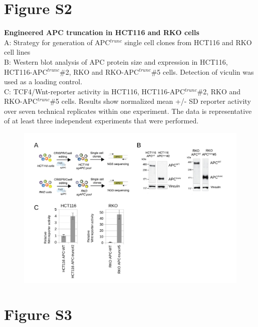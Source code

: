 \documentclass[11pt,a4paper,titlepage]{article}
\begin{document}
\pagebreak

\section*{Figure S2}

\textbf{Engineered APC truncation in HCT116 and RKO cells}\\
A: Strategy for generation of APC$^{trunc}$ single cell clones from HCT116 and RKO cell lines\\
B: Western blot analysis of APC protein size and expression in HCT116, HCT116-APC$^{trunc}$\#2, RKO and RKO-APC$^{trunc}$\#5 cells. Detection of viculin was used as a loading control.\\
C: TCF4/Wnt-reporter activity in HCT116, HCT116-APC$^{trunc}$\#2, RKO and RKO-APC$^{trunc}$\#5 cells. Results show normalized mean +/- SD reporter activity over seven technical replicates within one experiment. The data is representative of at least three independent experiments that were performed.

\begin{figure}[h]
\includegraphics[scale=0.9]{FigureS2.pdf} 

\end{figure}

\pagebreak
\section*{Figure S3}
\end{document}
